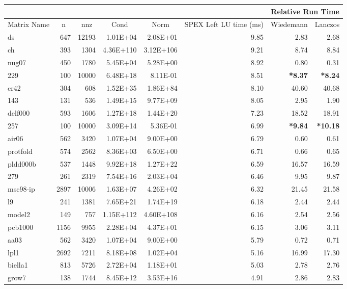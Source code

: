 \documentclass[10pt]{article}
\newcommand{\red}{
	\color{red}	
	}
\begin{document}
\begin{longtable}{|l|r|r|r|r|r|r|r|}
\hline	
& & & & & & \multicolumn{2}{c|}{Relative Run Time}  \\ \hline
\multicolumn{1}{|c|}{Matrix Name}	& \multicolumn{1}{c|}{n} & \multicolumn{1}{c|}{nnz} & \multicolumn{1}{c|}{Cond} & \multicolumn{1}{c|}{Norm} & \multicolumn{1}{c|}{SPEX Left LU time (ms)} & \multicolumn{1}{c|}{Wiedemann} & \multicolumn{1}{c|}{Lanczos} \\  \hline \endhead
ds	&	647	&	12193	&	1.01E+04	&	2.08E+01	&	9.85	&	2.83	&	2.68	\\
ch	&	393	&	1304	&	4.36E+110	&	3.12E+106	&	9.21	&	8.74	&	8.84	\\
nug07	&	450	&	1780	&	5.45E+04	&	5.28E+00	&	8.92	&	0.80	&	0.31	\\
229	&	100	&	10000	&	6.48E+18	&	8.11E-01	&	8.51	&	{\bf \red *8.37}	&	{\bf \red *8.24}	\\
cr42	&	304	&	608	&	1.52E+35	&	1.86E+84	&	8.10	&	40.60	&	40.68	\\
143	&	131	&	536	&	1.49E+15	&	9.77E+09	&	8.05	&	2.95	&	1.90	\\
delf000	&	593	&	1606	&	1.27E+18	&	1.44E+20	&	7.23	&	18.52	&	18.91	\\
257	&	100	&	10000	&	3.09E+14	&	5.36E-01	&	6.99	&	{\bf \red *9.84} 	&	{\bf \red *10.18} 	\\
air06	&	562	&	3420	&	1.07E+04	&	9.00E+00	&	6.79	&	0.60	&	0.61	\\
protfold	&	574	&	2562	&	8.36E+03	&	6.50E+00	&	6.71	&	0.66	&	0.65	\\
pldd000b	&	537	&	1448	&	9.92E+18	&	1.27E+22	&	6.59	&	16.57	&	16.59	\\
279	&	261	&	2319	&	7.54E+16	&	2.03E+04	&	6.46	&	9.95	&	9.87	\\
msc98-ip	&	2897	&	10006	&	1.63E+07	&	4.26E+02	&	6.32	&	21.45	&	21.58	\\
l9	&	241	&	1381	&	7.65E+21	&	1.74E+19	&	6.18	&	2.44	&	2.44	\\
model2	&	149	&	757	&	1.15E+112	&	4.60E+108	&	6.16	&	2.54	&	2.56	\\
pcb1000	&	1156	&	9955	&	2.28E+04	&	4.37E+01	&	6.15	&	3.06	&	3.11	\\
aa03	&	562	&	3420	&	1.07E+04	&	9.00E+00	&	5.79	&	0.72	&	0.71	\\
lpl1	&	2692	&	7211	&	8.18E+08	&	1.02E+04	&	5.16	&	16.99	&	17.30	\\
biella1	&	813	&	5726	&	2.72E+04	&	1.18E+01	&	5.03	&	2.78	&	2.76	\\
grow7	&	138	&	1744	&	8.45E+12	&	3.53E+16	&	4.91	&	2.86	&	2.83	\\

\end{longtable}
\end{document}

